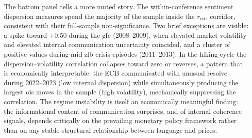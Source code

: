 The bottom panel tells a more muted story. The within-conference sentiment dispersion measures spend the majority of the sample inside the $r_{\text{crit}}$ corridor, consistent with their full-sample non-significance. Two brief exceptions are visible: a spike toward $+0.50$ during the \gls{gfc} (2008--2009), when elevated market volatility and elevated internal communication uncertainty coincided, and a cluster of positive values during mid-\gls{zlb} crisis episodes (2011--2013). In the hiking cycle the dispersion--volatility correlation collapses toward zero or reverses, a pattern that is economically interpretable: the ECB communicated with unusual resolve during 2022--2023 (low internal dispersion) while simultaneously producing the largest \gls{ois} moves in the sample (high volatility), mechanically suppressing the correlation. The regime instability is itself an economically meaningful finding: the informational content of communication surprises, and of internal coherence signals, depends critically on the prevailing monetary policy framework rather than on any stable structural relationship between language and prices.